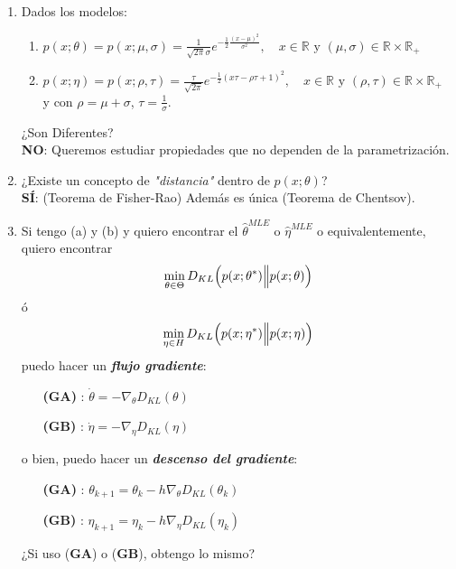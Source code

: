 \begin{enumerate}
    \item Dados los modelos:
    \begin{enumerate}[label=(\alph*)]
        \item $p(x;\theta)=p(x;\mu,\sigma)=\frac{1}{\sqrt{2\pi}\sigma}e^{-\frac{1}{2}\frac{(x-\mu)^2}{\sigma^2}},\quad x\in\mathbb{R}\text{ y }(\mu,\sigma)\in\mathbb{R}\times\mathbb{R}_+$
        \item $p(x;\eta)=p(x;\rho,\tau)=\frac{\tau}{\sqrt{2\pi}}e^{-\frac{1}{2}(x\tau-\rho\tau+1)^2},\quad x\in\mathbb{R}\text{ y }(\rho,\tau)\in\mathbb{R}\times\mathbb{R}_+$\\
        y con $\rho=\mu+\sigma$, $\tau=\frac{1}{\sigma}$.
    \end{enumerate}
    ¿Son Diferentes?\\
    
    \textbf{NO}: Queremos estudiar propiedades que no dependen de la parametrizaci\'on.
    \item ¿Existe un concepto de \textit{"distancia"} dentro de $p(x;\theta)$?\\

    \textbf{S\'I}: (Teorema de Fisher-Rao) Adem\'as es \'unica (Teorema de Chentsov).
    \item Si tengo (a) y (b) y  quiero encontrar el $\hat{\theta}^{MLE}$ o $\hat{\eta}^{MLE}$ o equivalentemente, quiero encontrar 
    \begin{equation*}
        \min_{\theta\in\Theta}D_{KL}\Bigl(p(x;\theta^*)\Big\|p(x;\theta)\Bigl)
    \end{equation*}
    \'o
    \begin{equation*}
        \min_{\eta\in H}D_{KL}\Bigl(p(x;\eta^*)\Big\|p(x;\eta)\Bigl)
    \end{equation*}
    puedo hacer un \textit{\textbf{flujo gradiente}}:
    \begin{enumerate}
        \item[\textbf{(GA)}]: $\dot{\theta}=-\nabla_\theta D_{KL}(\theta)$ %
        \item[\textbf{(GB)}]: $\dot{\eta}=-\nabla_\eta D_{KL}(\eta)$
    \end{enumerate}
    o bien, puedo hacer un \textit{\textbf{descenso del gradiente}}:
    \begin{enumerate}
        \item[\textbf{(GA)}]: $\theta_{k+1}=\theta_k-h\nabla_\theta D_{KL}(\theta_k)$
        \item[\textbf{(GB)}]: $\eta_{k+1}=\eta_k-h\nabla_\eta D_{KL}(\eta_k)$
    \end{enumerate}
    ¿Si uso (\textbf{GA}) o (\textbf{GB}), obtengo lo mismo?\\


\end{enumerate}
